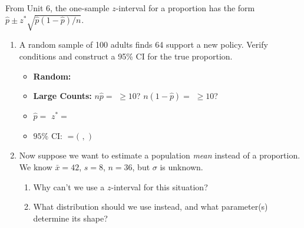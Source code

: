 \documentclass[10pt]{article}
\begin{document}
\namedateperiod

\vspace{0.15in}

From Unit 6, the one-sample $z$-interval for a proportion has the form
$\hat p \pm z^* \sqrt{\hat p(1 - \hat p)/n}$.

\begin{enumerate}
  \item A random sample of 100 adults finds 64 support a new policy. Verify
        conditions and construct a 95\% CI for the true proportion.

        \begin{itemize}
          \item \textbf{Random:} \blank{5cm}
          \item \textbf{Large Counts:} $n\hat p = $ \blank{2cm}$ \ge 10$? \blank{1cm}
                \quad $n(1-\hat p) = $ \blank{2cm}$ \ge 10$? \blank{1cm}
          \item $\hat p = $ \blank{2cm} \quad $z^* = $ \blank{2cm}
          \item $95\%$ CI: \blank{8cm} $= ($ \blank{2cm} $,$ \blank{2cm} $)$
        \end{itemize}

  \item Now suppose we want to estimate a population \emph{mean} instead of a
        proportion. We know $\bar x = 42$, $s = 8$, $n = 36$, but $\sigma$ is unknown.

        \begin{enumerate}[label=\alph*.]
          \item Why can't we use a $z$-interval for this situation?

          \item What distribution should we use instead, and what parameter(s)
                determine its shape?
        \end{enumerate}
\end{enumerate}
\end{document}
